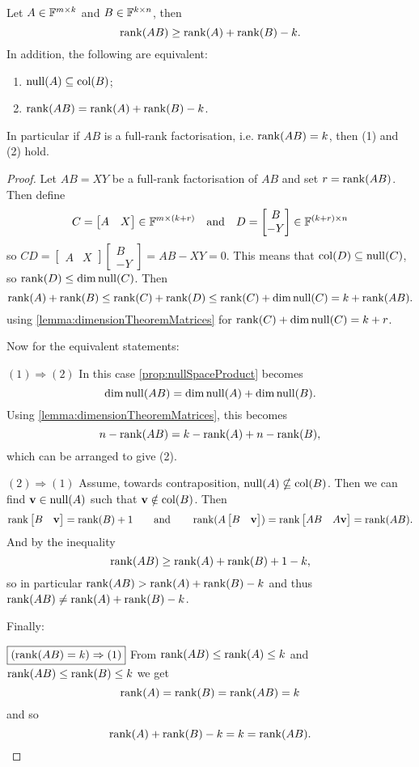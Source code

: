\begin{proposition} \label{prop:SylvesterRankInequality}
Let $A\in\mathbb{F}^{m\times k}$ and $B\in\mathbb{F}^{k\times n}$, then
\[ \operatorname{rank}(AB) \geq \operatorname{rank}(A)+\operatorname{rank}(B) - k. \]
In addition, the following are equivalent:
\begin{enumerate}
\item $\operatorname{null}(A)\subseteq \operatorname{col}(B)$;
\item $\operatorname{rank}(AB) = \operatorname{rank}(A)+\operatorname{rank}(B) - k$.
\end{enumerate}
In particular if $AB$ is a full-rank factorisation, i.e. $\operatorname{rank}(AB) = k$, then (1) and (2) hold.
\end{proposition}
\begin{proof}
Let $AB = XY$ be a full-rank factorisation of $AB$ and set $r=\operatorname{rank}(AB)$. Then define
\[ C = \begin{bmatrix}
A & X
\end{bmatrix}\in\mathbb{F}^{m\times(k+r)} \quad\text{and}\quad D=\begin{bmatrix}
B \\ -Y
\end{bmatrix}\in\mathbb{F}^{(k+r)\times n}\]
so $CD = \begin{bmatrix}
A & X
\end{bmatrix}\begin{bmatrix}
B \\ -Y
\end{bmatrix} = AB-XY = 0$.
This means that $\operatorname{col}(D)\subseteq \operatorname{null}(C)$, so $\operatorname{rank}(D)\leq \dim\operatorname{null}(C)$. Then
\[ \operatorname{rank}(A) + \operatorname{rank}(B) \leq \operatorname{rank}(C) + \operatorname{rank}(D) \leq \operatorname{rank}(C) + \dim\operatorname{null}(C) = k+\operatorname{rank}(AB). \]
using \ref{lemma:dimensionTheoremMatrices} for $\operatorname{rank}(C) + \dim\operatorname{null}(C) = k+r$.

Now for the equivalent statements:

$\boxed{(1)\Rightarrow (2)}$ In this case \ref{prop:nullSpaceProduct} becomes
\[ \dim\operatorname{null}(AB) = \dim\operatorname{null}(A) + \dim\operatorname{null}(B). \]
Using \ref{lemma:dimensionTheoremMatrices}, this becomes
\[ n - \operatorname{rank}(AB) = k-\operatorname{rank}(A) + n-\operatorname{rank}(B), \]
which can be arranged to give (2).

$\boxed{(2)\Rightarrow (1)}$ Assume, towards contraposition, $\operatorname{null}(A) \nsubseteq \operatorname{col}(B)$. Then we can find $\bm{\mathrm{v}}\in\operatorname{null}(A)$ such that $\bm{\mathrm{v}}\notin \operatorname{col}(B)$. Then
\[ \operatorname{rank} \begin{bmatrix}
B & \bm{\mathrm{v}}
\end{bmatrix} = \operatorname{rank}(B) + 1 \qquad\text{and}\qquad \operatorname{rank}(A \begin{bmatrix}
B & \bm{\mathrm{v}}
\end{bmatrix}) = \operatorname{rank}\begin{bmatrix}
AB & A\bm{\mathrm{v}}
\end{bmatrix} = \operatorname{rank}(AB). \]
And by the inequality
\[ \operatorname{rank}(AB) \geq \operatorname{rank}(A)+\operatorname{rank}(B)+1-k, \]
so in particular $\operatorname{rank}(AB) > \operatorname{rank}(A)+\operatorname{rank}(B)-k$ and thus $\operatorname{rank}(AB) \neq \operatorname{rank}(A)+\operatorname{rank}(B)-k$.

Finally:

$\boxed{(\operatorname{rank}(AB) = k)\Rightarrow (1)}$ From $\operatorname{rank}(AB)\leq\operatorname{rank}(A)\leq k$ and $\operatorname{rank}(AB)\leq\operatorname{rank}(B)\leq k$ we get
\[ \operatorname{rank}(A) = \operatorname{rank}(B) = \operatorname{rank}(AB) = k \]
and so
\[ \operatorname{rank}(A) + \operatorname{rank}(B) - k = k =\operatorname{rank}(AB). \]
\end{proof}
